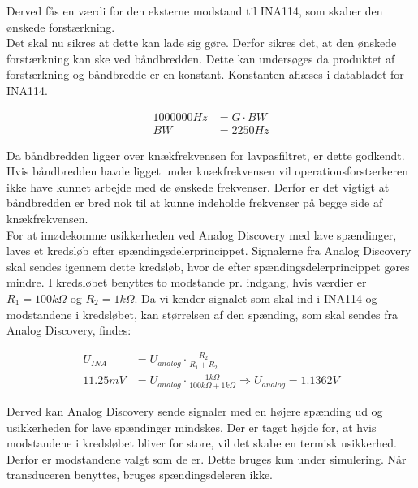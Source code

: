 Derved fås en værdi for den eksterne modstand til INA114, som skaber den ønskede forstærkning.\\
Det skal nu sikres at dette kan lade sig gøre. Derfor sikres det, at den ønskede forstærkning kan ske ved båndbredden. Dette kan undersøges da produktet af forstærkning og båndbredde er en konstant. Konstanten aflæses i databladet for INA114\cite{INA}. 
\begin{ceqn}
\begin{equation}
\begin{split}
1000000 Hz& = G\cdot BW \\
BW& = 2250 Hz
\end{split}
\end{equation}
\end{ceqn}
Da båndbredden ligger over knækfrekvensen for lavpasfiltret, er dette godkendt. Hvis båndbredden havde ligget under knækfrekvensen vil operationsforstærkeren ikke have kunnet arbejde med de ønskede frekvenser. Derfor er det vigtigt at båndbredden er bred nok til at kunne indeholde frekvenser på begge side af knækfrekvensen.\\
\newline 
For at imødekomme usikkerheden ved Analog Discovery med lave spændinger, laves et kredsløb efter spændingsdelerprincippet. Signalerne fra Analog Discovery skal sendes igennem dette kredsløb, hvor de efter spændingsdelerprincippet gøres mindre. I kredsløbet benyttes to modstande pr. indgang, hvis værdier er $ R_1=100k\Omega $ og $ R_2 = 1k\Omega $. Da vi kender signalet som skal ind i INA114 og modstandene i kredsløbet, kan størrelsen af den spænding, som skal sendes fra Analog Discovery, findes:
\begin{ceqn}
\begin{equation}
\begin{split}
U_{INA}& = U_{analog} \cdot \frac{R_2}{R_1 + R_2} \\
11.25mV& = U_{analog}\cdot \frac{1k\Omega}{100k\Omega+1k\Omega} \Rightarrow U_{analog}=1.1362 V
\end{split}
\end{equation}
\end{ceqn}
Derved kan Analog Discovery sende signaler med en højere spænding ud og usikkerheden for lave spændinger mindskes. Der er taget højde for, at hvis modstandene i kredsløbet bliver for store, vil det skabe en termisk usikkerhed. Derfor er modstandene valgt som de er. Dette bruges kun under simulering. Når transduceren benyttes, bruges spændingsdeleren ikke.  
  

